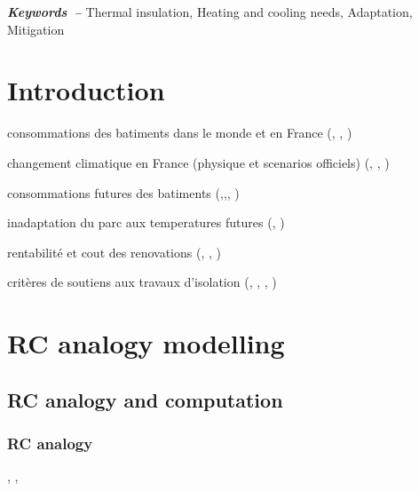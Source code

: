 \documentclass[11pt]{article}
\providecommand{\keywords}[1]
{
  \small    
  \textbf{\textit{Keywords~--}} #1
}
\begin{document}
\keywords{Thermal insulation, Heating and cooling needs, Adaptation, Mitigation}

\clearpage
\tableofcontents

\clearpage

\section{Introduction}
\label{sec:intro}

consommations des batiments dans le monde et en France (\cite{unep_2023_2024}, \cite{sdes_chiffres_2023}, \cite{sdes_consommation_2023})

changement climatique en France (physique et scenarios officiels) (\cite{ipcc_climate_2021}, \cite{ouzeau_heat_2016}, \cite{ministere_de_la_transition_ecologique_trajectoire_2023})

consommations futures des batiments (\cite{larsen_climate_2020},\cite{moreau_evaluation_2023},\cite{filahi_projections_2024}, \cite{tao_uncertainty_2024})

inadaptation du parc aux temperatures futures (\cite{cour_des_comptes_laction_2024}, \cite{i4ce_vagues_2024})

rentabilité et cout des renovations (\cite{ademe_renovation_2019}, \cite{i4ce_trajectoires_2023}, \cite{giraudet_analyse_2024})

critères de soutiens aux travaux d'isolation (\cite{france_strategie_dispositif_2024}, \cite{coulaud_maprimerenov_2024}, \cite{anah_aides_2024-1}, \cite{dagostino_impact_2024})

\clearpage
\section{RC analogy modelling}
\label{sec:rc}

    \subsection{RC analogy and computation} %
    \label{sub:rc_analogy_and_computation}

        \subsubsection{RC analogy} %
        \label{ssub:rc_analogy}


        \cite{fourier_theorie_1822}, \cite{ohm_galvanische_1827}, \cite{bolmont_evolution_2003}
        
\end{document}
